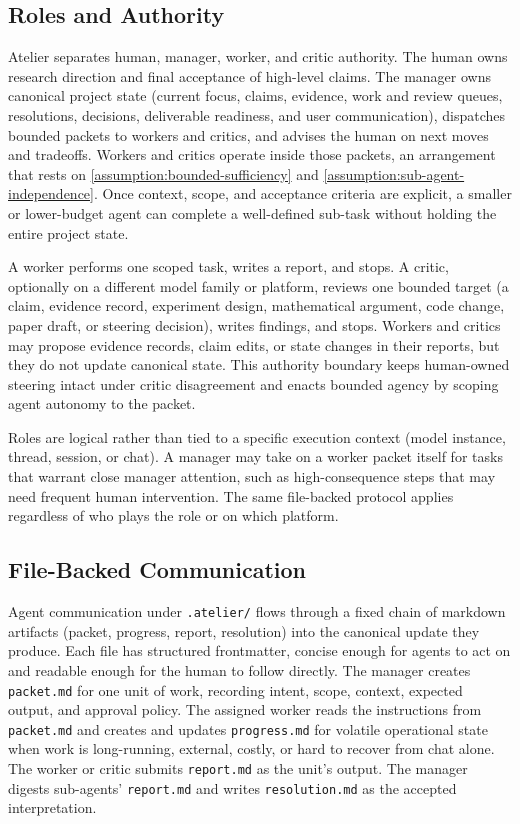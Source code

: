 \subsection{Roles and Authority}

Atelier separates human, manager, worker, and critic authority. The human owns research direction and final acceptance of high-level claims. The manager owns canonical project state (current focus, claims, evidence, work and review queues, resolutions, decisions, deliverable readiness, and user communication), dispatches bounded packets to workers and critics, and advises the human on next moves and tradeoffs. Workers and critics operate inside those packets, an arrangement that rests on \cref{assumption:bounded-sufficiency} and \cref{assumption:sub-agent-independence}. Once context, scope, and acceptance criteria are explicit, a smaller or lower-budget agent can complete a well-defined sub-task without holding the entire project state.

A worker performs one scoped task, writes a report, and stops. A critic, optionally on a different model family or platform, reviews one bounded target (a claim, evidence record, experiment design, mathematical argument, code change, paper draft, or steering decision), writes findings, and stops. Workers and critics may propose evidence records, claim edits, or state changes in their reports, but they do not update canonical state. This authority boundary keeps human-owned steering intact under critic disagreement and enacts bounded agency by scoping agent autonomy to the packet.

Roles are logical rather than tied to a specific execution context (model instance, thread, session, or chat). A manager may take on a worker packet itself for tasks that warrant close manager attention, such as high-consequence steps that may need frequent human intervention. The same file-backed protocol applies regardless of who plays the role or on which platform.

\subsection{File-Backed Communication}

Agent communication under \texttt{.atelier/} flows through a fixed chain of markdown artifacts (packet, progress, report, resolution) into the canonical update they produce. Each file has structured frontmatter, concise enough for agents to act on and readable enough for the human to follow directly. The manager creates \texttt{packet.md} for one unit of work, recording intent, scope, context, expected output, and approval policy. The assigned worker reads the instructions from \texttt{packet.md} and creates and updates \texttt{progress.md} for volatile operational state when work is long-running, external, costly, or hard to recover from chat alone. The worker or critic submits \texttt{report.md} as the unit's output. The manager digests sub-agents' \texttt{report.md} and writes \texttt{resolution.md} as the accepted interpretation.

